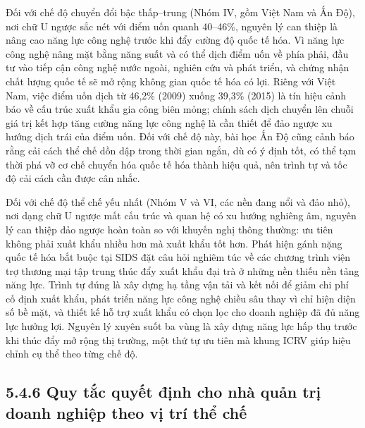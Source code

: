 \documentclass[
  a4paper,
  13pt]{extreport}
\begin{document}
Đối với chế độ chuyển đổi bậc thấp--trung (Nhóm IV, gồm Việt Nam và Ấn
Độ), nơi chữ U ngược sắc nét với điểm uốn quanh 40--46\%, nguyên lý can
thiệp là nâng cao năng lực công nghệ trước khi đẩy cường độ quốc tế hóa.
Vì năng lực công nghệ nâng mặt bằng năng suất và có thể dịch điểm uốn về
phía phải, đầu tư vào tiếp cận công nghệ nước ngoài, nghiên cứu và phát
triển, và chứng nhận chất lượng quốc tế sẽ mở rộng không gian quốc tế
hóa có lợi. Riêng với Việt Nam, việc điểm uốn dịch từ 46,2\% (2009)
xuống 39,3\% (2015) là tín hiệu cảnh báo về cấu trúc xuất khẩu gia công
biên mỏng; chính sách dịch chuyển lên chuỗi giá trị kết hợp tăng cường
năng lực công nghệ là cần thiết để đảo ngược xu hướng dịch trái của điểm
uốn. Đối với chế độ này, bài học Ấn Độ cũng cảnh báo rằng cải cách thể
chế dồn dập trong thời gian ngắn, dù có ý định tốt, có thể tạm thời phá
vỡ cơ chế chuyển hóa quốc tế hóa thành hiệu quả, nên trình tự và tốc độ
cải cách cần được cân nhắc.

Đối với chế độ thể chế yếu nhất (Nhóm V và VI, các nền đang nổi và đảo
nhỏ), nơi dạng chữ U ngược mất cấu trúc và quan hệ có xu hướng nghiêng
âm, nguyên lý can thiệp đảo ngược hoàn toàn so với khuyến nghị thông
thường: ưu tiên không phải xuất khẩu nhiều hơn mà xuất khẩu tốt hơn.
Phát hiện gánh nặng quốc tế hóa bắt buộc tại SIDS đặt câu hỏi nghiêm túc
về các chương trình viện trợ thương mại tập trung thúc đẩy xuất khẩu đại
trà ở những nền thiếu nền tảng năng lực. Trình tự đúng là xây dựng hạ
tầng vận tải và kết nối để giảm chi phí cố định xuất khẩu, phát triển
năng lực công nghệ chiều sâu thay vì chỉ hiện diện số bề mặt, và thiết
kế hỗ trợ xuất khẩu có chọn lọc cho doanh nghiệp đã đủ năng lực hưởng
lợi. Nguyên lý xuyên suốt ba vùng là xây dựng năng lực hấp thụ trước khi
thúc đẩy mở rộng thị trường, một thứ tự ưu tiên mà khung ICRV giúp hiệu
chỉnh cụ thể theo từng chế độ.

\hypertarget{quy-tux1eafc-quyux1ebft-ux111ux1ecbnh-cho-nhuxe0-quux1ea3n-trux1ecb-doanh-nghiux1ec7p-theo-vux1ecb-truxed-thux1ec3-chux1ebf}{%
\subsection{5.4.6 Quy tắc quyết định cho nhà quản trị doanh nghiệp theo
vị trí thể
chế}\label{quy-tux1eafc-quyux1ebft-ux111ux1ecbnh-cho-nhuxe0-quux1ea3n-trux1ecb-doanh-nghiux1ec7p-theo-vux1ecb-truxed-thux1ec3-chux1ebf}}
\end{document}
